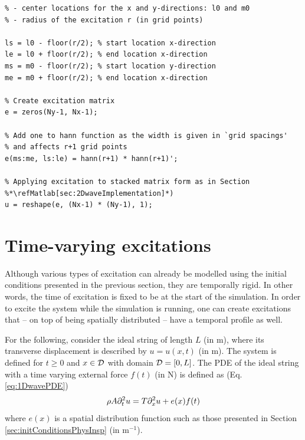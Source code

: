 \noindent
\begin{minipage}{\textwidth}
\setlstMAT
\begin{lstlisting}[caption={A \texttt{MATLAB} implementation of a 2D raised cosine.}, label=alg:2DraisedCos]
% Assuming Dirichlet boundary conditions and having initialised the following
% - center locations for the x and y-directions: l0 and m0
% - radius of the excitation r (in grid points)

ls = l0 - floor(r/2); % start location x-direction
le = l0 + floor(r/2); % end location x-direction
ms = m0 - floor(r/2); % start location y-direction
me = m0 + floor(r/2); % end location x-direction

% Create excitation matrix
e = zeros(Ny-1, Nx-1);

% Add one to hann function as the width is given in `grid spacings'
% and affects r+1 grid points
e(ms:me, ls:le) = hann(r+1) * hann(r+1)';

% Applying excitation to stacked matrix form as in Section %*\refMatlab[sec:2DwaveImplementation]*)
u = reshape(e, (Nx-1) * (Ny-1), 1);
\end{lstlisting} 
\end{minipage}
    
\section{Time-varying excitations}\label{sec:timeVaryingExcitations}
Although various types of excitation can already be modelled using the initial conditions presented in the previous section, they are temporally rigid. In other words, the time of excitation is fixed to be at the start of the simulation. In order to excite the system while the simulation is running, one can create excitations that -- on top of being spatially distributed -- have a temporal profile as well.

For the following, consider the ideal string of length $L$ (in m), where its transverse displacement is described by $u = u(x,t)$ (in m). The system is defined for $t\geq 0$ and $x\in\mathcal{D}$ with domain $\mathcal{D} = [0, L]$. The PDE of the ideal string with a time varying external force $f(t)$ (in N) is defined as (Eq. \eqref{eq:1DwavePDE})
\begin{equation}\label{eq:timeVaryingExcitation1DWave}
    \rho A\partial_t^2 u = T \partial_x^2 u + e(x)f(t)
\end{equation}
where $e(x)$ is a spatial distribution function such as those presented in Section \ref{sec:initConditionsPhysInsp} (in m$^{-1}$).

